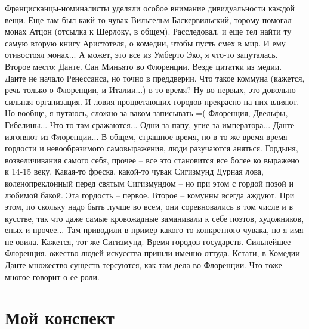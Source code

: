 Францисканцы-номиналисты уделяли особое внимание   дивидуальности каждой вещи.
Еще там был какй-то чувак Вильгельм Баскервильский,   торому помогал монах Атцон
(отсылка к Шерлоку, в общем). Расследовал, и еще тел   найти ту самую вторую книгу
Аристотеля, о комедии, чтобы пусть смех в мир. И ему   отивостоял монах... А может, это все
из Умберто Эко, я что-то запуталась.
Второе место:
Данте. Сан Миньято во Флоренции. Везде цитатки из медии.
Данте не начало Ренессанса, но точно в преддверии.
Что такое коммуна (кажется, речь только о Флоренции, и   Италии...) в то время? Ну
во-первых, это довольно сильная организация. И ловия   процветающих городов прекрасно
на них влияют. Но вообще, я путаюсь, сложно за ваком   записывать =( Флоренция, Двельфы,
Гибелины... Что-то там сражаются... Одни за папу, угие   за императора... Данте изгоняют из
Флоренции... В общем, страшное время, но в то же время    время гордости и
невообразимого самовыражения, люди разучаются аняться.   Гордыня, возвеличивания
самого себя, прочее -- все это становится все более ко   выражено к 14-15 веку.
Какая-то фреска, какой-то чувак Сигизмунд Дурная лова,   коленопреклонный перед святым
Сигизмундом -- но при этом с гордой позой и любимой   бакой.
Эта гордость -- первое. Второе -- комунны всегда   аждуют. При этом, по скольку надо быть
лучше во всем, они соревновались в том числе и в   кусстве, так что даже самые
кровожадные заманивали к себе поэтов, художников, еных   и прочее... Там приводили в
пример какого-то конкретного чувака, но я имя не овила.   Кажется, тот же Сигизмунд.
Время городов-государств. Сильнейшее -- Флоренция.   ожество людей искусства пришли
именно оттуда.
Кстати, в Комедии Данте множество существ терсуются,   как там дела во Флоренции. Что
тоже многое говорит о ее роли.
\section{Мой конспект}
